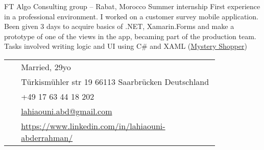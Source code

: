 \documentclass[10pt]{article} %
\begin{document}
\begin{paracol}{2}
\vspace{-\baselineskip}\medskip %

{FT} %
{Algo Consulting group -- Rabat, Morocco} %
{Summer internship} %
{First experience in a professional environment. I worked on a customer survey mobile application. Been given 3 days to acquire basics of .NET, Xamarin.Forms and make a prototype of one of the views in the app, becaming part of the production team. Tasks involved writing logic and UI using C\# and XAML (\href{https://play.google.com/store/apps/details?id=ma.ram.customersurvey\&hl=en}{Mystery Shopper})}  %


\vspace{-\baselineskip}\medskip %

\medskip %


\switchcolumn %


\parbox[top][0.10\textheight][c]{\linewidth}{ %
	\vspace{-0.05\textheight} %
	\colorbox{shade}{ %
		\begin{supertabular}{p{0.05\linewidth}|p{0.775\linewidth}} %
			\raisebox{-1pt}{\faUser} & Married, 29yo\\ %
			\raisebox{-1pt}{\faHome} & Türkismühler str 19 66113 Saarbrücken Deutschland \\ %
			\raisebox{-1pt}{\faPhone} & +49 17 63 44 18 202 \\ %
			\raisebox{0pt}{\small\faEnvelope} & \href{mailto:lahiaouni.abd@gmail.com}{lahiaouni.abd@gmail.com} \\ %
			\raisebox{-1pt}{\faLinkedinSquare} & \href{https://www.linkedin.com/in/lahiaouni-abderrahman/}{https://www.linkedin.com/in/lahiaouni-abderrahman/} \\ %
		\end{supertabular}
	}
}


\end{paracol}
\end{document}
